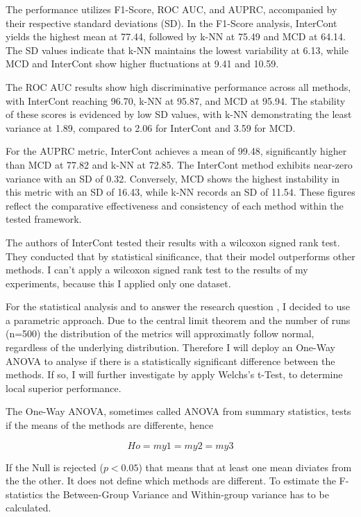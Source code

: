 The performance utilizes F1-Score, ROC AUC, and AUPRC, accompanied by their respective standard deviations (SD). 
In the F1-Score analysis, InterCont yields the highest mean at 77.44, followed by k-NN at 75.49 and MCD at 64.14. 
The SD values indicate that k-NN maintains the lowest variability at 6.13, while MCD and InterCont show higher fluctuations at 9.41 and 10.59.


The ROC AUC results show high discriminative performance across all methods, with InterCont reaching 96.70, k-NN at 95.87, and MCD at 95.94. 
The stability of these scores is evidenced by low SD values, with k-NN demonstrating the least variance at 1.89, compared to 2.06 for InterCont and 3.59 for MCD.


For the AUPRC metric, InterCont achieves a mean of 99.48, significantly higher than MCD at 77.82 and k-NN at 72.85. 
The InterCont method exhibits near-zero variance with an SD of 0.32. 
Conversely, MCD shows the highest instability in this metric with an SD of 16.43, while k-NN records an SD of 11.54. 
These figures reflect the comparative effectiveness and consistency of each method within the tested framework.



The authors of InterCont tested their results with a wilcoxon signed rank test. 
They conducted that by statistical sinificance, that their model outperforms other methods.
I can't apply a wilcoxon signed rank test to the results of my experiments, because this I applied only one dataset. 


For the statistical analysis and to answer the research question , I decided to use a parametric approach.
Due to the central limit theorem and the number of runs (n=500) the distribution of the metrics will approximatly follow normal, regardless of the underlying distribution. 
Therefore I will deploy an One-Way ANOVA to analyse if there is a statistically significant difference between the methods.
If so, I will further investigate by apply Welchs's t-Test, to determine local superior performance.


The One-Way ANOVA, sometimes called ANOVA from summary statistics, tests if the means of the methods are differente, hence

\begin{equation}
    Ho = my1 = my2 = my3
\end{equation}

If the Null is rejected ($p<0.05$) that means that at least one mean diviates from the the other. 
It does not define which methods are different.
To estimate the F-statistics the  Between-Group Variance and Within-group variance has to be calculated.


